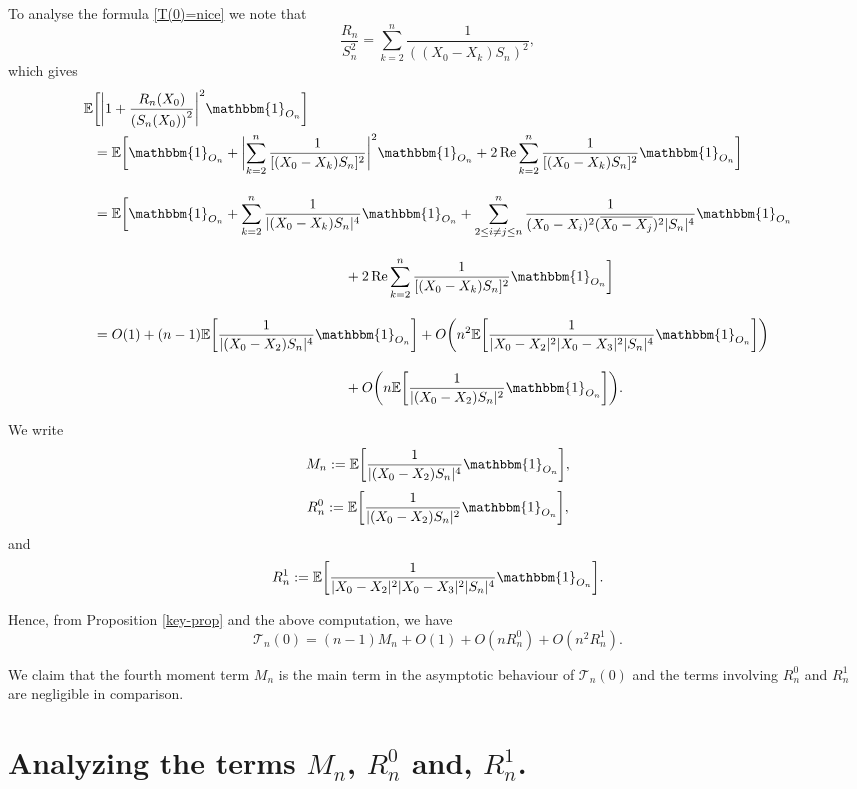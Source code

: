 \documentclass[9pt,a4paper,reqno]{amsart}
\renewcommand{\Re}{\operatorname{Re}}
\theoremstyle{mine}
\theoremstyle{definition}
\theoremstyle{remark}
\newcommand{\mb}{\mathbb}
\begin{document}
To analyse the formula \eqref{T(0)=nice} we note that 
\[ \frac{R_n}{S_n^2} = \sum_{k=2}^n \frac{1}{((X_0-X_k)S_n)^2},\]
which gives 
\begin{align*}
   \mathbb{E}&\biggl[ \biggl| 1 + 
    \frac{R_n(X_0)}
         { \left(S_n(X_0)\right)^2 }
    \biggr|^2 \mathbbm{1}_{O_n}\biggr] \\ &= \mathbb{E}\biggl[ \mathbbm{1}_{O_n} + \biggl| \sum_{k=2}^n\frac{1}{[(X_0-X_k)S_n]^2}\biggr|^2 \mathbbm{1}_{O_n} + 2 \Re \sum_{k=2}^n\frac{1}{[(X_0-X_k)S_n]^2} \mathbbm{1}_{O_n}
     \biggr]\\[1em]
     &=\mathbb{E}\biggl[ \mathbbm{1}_{O_n} + \sum_{k=2}^n\frac{1}{|(X_0-X_k)S_n|^4} \mathbbm{1}_{O_n}+ \sum_{2\leq i\neq j\leq n}^n\frac{1}{(X_0-X_i)^2(\overline{X_0-X_j})^2|S_n|^4} \mathbbm{1}_{O_n} \\[1em] & \qquad\qquad\qquad\qquad\qquad\qquad\qquad\qquad\qquad +2 \Re \sum_{k=2}^n\frac{1}{[(X_0-X_k)S_n]^2} \mathbbm{1}_{O_n} \biggr]
    \\[1em]
    &= O(1) + (n-1) \mathbb{E}\biggl[\frac{1}{|(X_0-X_2)S_n|^4}\mathbbm{1}_{O_n}\biggr] + O\biggl(n^2\mathbb{E}\biggl[\frac{1}{|X_0-X_2|^2|X_0-X_3|^2|S_n|^4} \mathbbm{1}_{O_n}\biggr]\biggl) \\[1em]&  \qquad\qquad\qquad\qquad\qquad\qquad\qquad\qquad\qquad +  O\biggl( n\mb{E}\biggl[\frac{1}{|(X_0-X_2)S_n|^2} \mathbbm{1}_{O_n}\biggr]\biggr).
\end{align*}

We write \[ M_n := \mathbb{E}\biggl[\frac{1}{|(X_0-X_2)S_n|^4}\mathbbm{1}_{O_n}\biggr],\]
\[ R_{n}^0 := \mb{E}\biggl[\frac{1}{|(X_0-X_2)S_n|^2} \mathbbm{1}_{O_n}\biggr], \]
and 
\[R_n^1 := \mathbb{E}\biggl[\frac{1}{|X_0-X_2|^2|X_0-X_3|^2|S_n|^4} \mathbbm{1}_{O_n}\biggr].\]


Hence, from Proposition \ref{key-prop} and the above computation, we have 
\begin{equation}\label{T-expansion}
    \mathcal{T}_n(0) = (n-1) M_n + O(1) + O(nR_n^0) + O(n^2 R_n^1).
\end{equation} 

We claim that the fourth moment term $M_n$ is the main term in the asymptotic behaviour of $\mathcal{T}_n(0)$ and the terms involving $R_n^0$ and $R_n^1$ are negligible in comparison. 

\section{Analyzing the terms \texorpdfstring{$M_n$}{Mn},
\texorpdfstring{$R_n^0$}{Rn0} and,
\texorpdfstring{$R_n^1$}{Rn1}.}
\label{some-heavy-computations}
\end{document}
